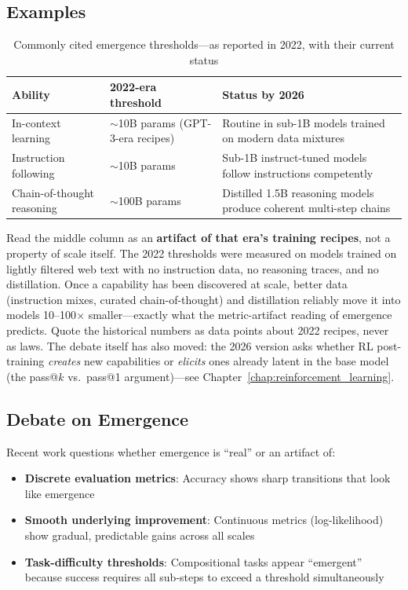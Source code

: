 \subsection{Examples}

\begin{table}[H]
\centering
\caption{Commonly cited emergence thresholds---as reported in 2022, with their current status}
\begin{tabularx}{\textwidth}{lXX}
\toprule
\textbf{Ability} & \textbf{2022-era threshold} & \textbf{Status by 2026} \\
\midrule
In-context learning & $\sim$10B params (GPT-3-era recipes) & Routine in sub-1B models trained on modern data mixtures \\
Instruction following & $\sim$10B params & Sub-1B instruct-tuned models follow instructions competently \\
Chain-of-thought reasoning & $\sim$100B params & Distilled 1.5B reasoning models produce coherent multi-step chains \\
\bottomrule
\end{tabularx}
\end{table}

Read the middle column as an \textbf{artifact of that era's training recipes}, not a property of scale itself. The 2022 thresholds were measured on models trained on lightly filtered web text with no instruction data, no reasoning traces, and no distillation. Once a capability has been discovered at scale, better data (instruction mixes, curated chain-of-thought) and distillation reliably move it into models 10--100$\times$ smaller---exactly what the metric-artifact reading of emergence predicts. Quote the historical numbers as data points about 2022 recipes, never as laws. The debate itself has also moved: the 2026 version asks whether RL post-training \textit{creates} new capabilities or \textit{elicits} ones already latent in the base model (the pass@$k$ vs.\ pass@1 argument)---see Chapter~\ref{chap:reinforcement_learning}.

\subsection{Debate on Emergence}

Recent work questions whether emergence is ``real'' or an artifact of:
\begin{itemize}
    \item \textbf{Discrete evaluation metrics}: Accuracy shows sharp transitions that look like emergence
    \item \textbf{Smooth underlying improvement}: Continuous metrics (log-likelihood) show gradual, predictable gains across all scales
    \item \textbf{Task-difficulty thresholds}: Compositional tasks appear ``emergent'' because success requires all sub-steps to exceed a threshold simultaneously
\end{itemize}


